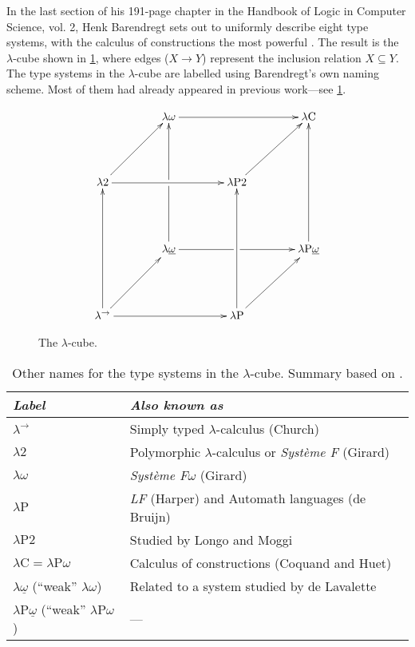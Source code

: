 \documentclass[12pt,toc=bibliography,numbers=noendperiod,
               footnotes=multiple,twoside]{scrartcl}
\begin{document}
In the last section of his 191-page chapter  in the Handbook of Logic in Computer Science, vol. 2, Henk Barendregt sets out to uniformly describe eight type systems, with the calculus of constructions the most powerful \autocite{barendregt_lambda_1992}. The result is the \(\lambda\)-cube shown in \cref{fig:lambda-cube}, where edges (\(X \longrightarrow Y\)) represent the inclusion relation \(X \subseteq Y\). The type systems in the \(\lambda\)-cube are labelled using Barendregt's own naming scheme. Most of them had already appeared in previous work---see \cref{tab:lambda-cube-type-systems}.

\begin{figure}
\begin{equation*}
\xymatrix@R46pt@C40pt{%
&\lambda\omega\ar@{->}[rr]&&\lambda\textrm{C} \\
\lambda\textrm{2}\ar@{->}[rr]\ar@{->}[ur]&&\lambda\textrm{P2}\ar@{->}[ur] \\
&\lambda\underline{\omega}\ar@{->}[uu]|!{"2,1";"2,3"}\hole\ar@{->}[rr]|!{"4,3";"2,3"}\hole&&\lambda\textrm{P}\underline{\omega}\ar@{->}[uu] \\
\lambda^{\rightarrow}\ar@{->}[uu]\ar@{->}[rr]\ar@{->}[ur]&&\lambda\textrm{P}\ar@{->}[uu]\ar@{->}[ur]
}
\end{equation*}
\caption{The \(\lambda\)-cube.}
\label{fig:lambda-cube}
\end{figure}

\begin{table}[h]
    \centering
    \begin{tabular}{l l}
        \toprule
        \textit{Label} & \textit{Also known as} \\
        \midrule
        \(\lambda^{\rightarrow}\) & Simply typed \(\lambda\)-calculus (Church) \\
        \(\lambda\textrm{2}\) & Polymorphic \(\lambda\)-calculus or \emph{Système F} (Girard) \\
        \(\lambda\omega\) & \emph{Système F\(\omega\)} (Girard) \\
        \(\lambda\textrm{P}\) & \emph{LF} (Harper) and Automath languages (de Bruijn) \\
        \(\lambda\textrm{P2}\) & Studied by Longo and Moggi \\
        \(\lambda\textrm{C} = \lambda\textrm{P}\omega\) & Calculus of constructions (Coquand and Huet) \\
        \(\lambda\underline{\omega}\) (\enquote{weak} \(\lambda\omega\)) & Related to a system studied by de Lavalette \\
        \(\lambda\textrm{P}\underline{\omega}\) (\enquote{weak} \(\lambda\textrm{P}\omega\)) & --- \\
        \bottomrule
    \end{tabular}
    \caption{Other names for the type systems in the \(\lambda\)-cube. Summary based on \textcite[193]{barendregt_lambda_1992}.}
    \label{tab:lambda-cube-type-systems}
\end{table}
\end{document}
